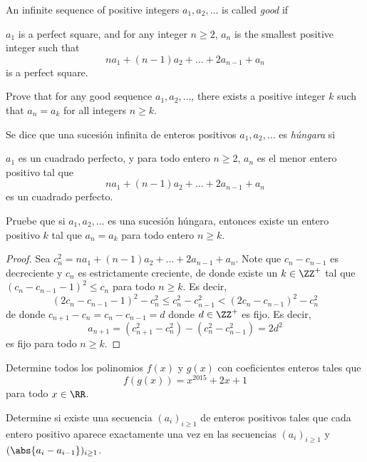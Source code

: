 \begin{probEG}[EGMO 2022/3]
	An infinite sequence of positive integers $a_1,a_2,\dots$ is called \emph{good} if
	\begin{enumerate}[(1)]
		\ii $a_1$ is a perfect square, and
		\ii for any integer $n\ge 2$, $a_n$ is the smallest positive integer such that
		\[na_1+(n-1)a_2+\dots+2a_{n-1}+a_n\]
		is a perfect square.
	\end{enumerate}
	Prove that for any good sequence $a_1,a_2,\dots$, there exists a positive integer $k$ such that $a_n=a_k$ for all integers $n\ge k$.
	\begin{probSP}
		Se dice que una sucesión infinita de enteros positivos $a_1,a_2,\dots$ es \emph{húngara} si
		\begin{enumerate}[(1)]
			\ii $a_1$ es un cuadrado perfecto, y
			\ii para todo entero $n\ge 2$, $a_n$ es el menor entero positivo tal que
			\[na_1+(n-1)a_2+\dots+2a_{n-1}+a_n\]
			es un cuadrado perfecto.
		\end{enumerate}
		Pruebe que si $a_1,a_2,\dots$ es una sucesión húngara, entonces existe un entero positivo $k$ tal que $a_n=a_k$ para todo entero $n\ge k$.
	\end{probSP}
\end{probEG}

\begin{proof}
	Sea $c_n^2=na_1+(n-1)a_2+\dots+2a_{n-1}+a_n$. Note que $c_n-c_{n-1}$ es decreciente y $c_n$ es estrictamente creciente, de donde existe un $k\in\ZZ^+$ tal que $(c_n-c_{n-1}-1)^2\le c_n$ para todo $n\ge k$. Es decir,
	\[(2c_n-c_{n-1}-1)^2-c_n^2\le c_n^2-c_{n-1}^2<(2c_n-c_{n-1})^2-c_n^2\]
	de donde $c_{n+1}-c_n=c_n-c_{n-1}=d$ donde $d\in\ZZ^+$ es fijo. Es decir,
	\[a_{n+1}=(c_{n+1}^2-c_n^2)-(c_n^2-c_{n-1}^2)=2d^2\]
	es fijo para todo $n\ge k$.
\end{proof}

\begin{probEG}
	Determine todos los polinomios $f(x)$ y $g(x)$ con coeficientes enteros tales que
	\[f(g(x))=x^{2015}+2x+1\]
	para todo $x\in\RR$.
\end{probEG}

\begin{probEG}
	Determine si existe una secuencia $(a_i)_{i\ge 1}$ de enteros positivos tales que cada entero positivo aparece exactamente una vez en las secuencias $(a_i)_{i\ge 1}$ y $(\abs{a_i-a_{i-1}})_{i\ge 1}$.
\end{probEG}

